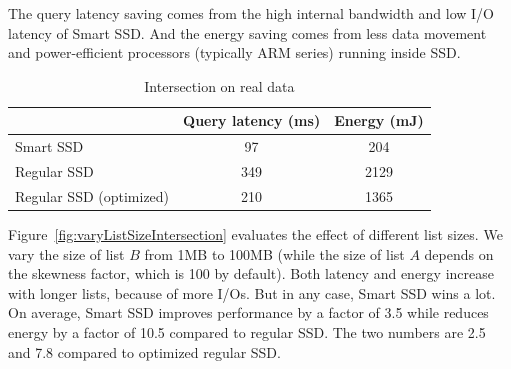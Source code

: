 The query latency saving comes from the high internal bandwidth and low I/O latency of Smart SSD. And the energy saving comes from less data movement and power-efficient processors (typically ARM series) running inside SSD.

\begin{table}[tbp]\small
\centering
\begin{tabular}{l|c|c}\hline\hline
& \textbf{Query latency (ms)} & \textbf{Energy (mJ)}\\\hline
Smart SSD & 97 & 204\\\hline
Regular SSD & 349 & 2129\\\hline
Regular SSD (optimized) & 210 & 1365 \\\hline\hline
\end{tabular}
\caption{Intersection on real data}\label{tab:interRealData}
\end{table}

 Figure~\ref{fig:varyListSizeIntersection} evaluates the effect of different list sizes. We vary the size of list $B$ from 1MB to 100MB (while the size of list $A$ depends on the skewness factor, which is 100 by default). Both latency and energy increase with longer lists, because of more I/Os. But in any case, Smart SSD wins a lot. On average, Smart SSD improves performance by a factor of 3.5 while reduces energy by a factor of 10.5 compared to regular SSD. The two numbers are 2.5 and 7.8 compared to optimized regular SSD.


